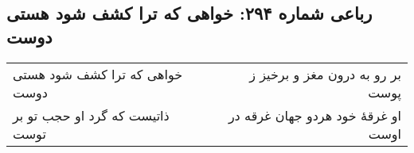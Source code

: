 \begin{center}
\section*{رباعی شماره ۲۹۴: خواهی که ترا کشف شود هستی دوست}
\label{sec:0294}
\begin{longtable}{l p{0.5cm} r}
خواهی که ترا کشف شود هستی دوست
&&
بر رو به درون مغز و برخیز ز پوست
\\
ذاتیست که گرد او حجب تو بر توست
&&
او غرقهٔ خود هردو جهان غرقه در اوست
\\
\end{longtable}
\end{center}
